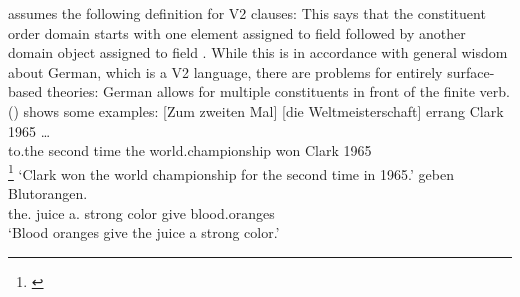 \documentclass[output=paper]{langsci/langscibook}
\begin{document}
\citet[]{Kathol2001a} assumes the following definition for V2 clauses:
\ea
{} \impl
{}
\z
This says that the constituent order domain starts with one element assigned to field 
followed by another domain object assigned to field . While this is in accordance with
general wisdom about German, which is a V2 language, there are problems for entirely surface-based
theories: German allows for multiple constituents in front of the finite verb. () shows some
examples:
\eal
\label{ex-mult-front}
\ex
\gll {}[Zum zweiten Mal] [die Weltmeisterschaft] errang Clark 1965 \ldots\\
	   \spacebr{}to.the second time \spacebr{}the world.championship won Clark 1965 {}\\
\footnote{
        \citep*[]{Benes71}
      }\label{bsp-zum-zweiten-mal-die-Weltmeisterschaft}
\glt `Clark won the world championship for the second time in 1965.'
\ex
\label{ex-dem-saft-eine-kraeftige-farbe}
 geben Blutorangen.\footnotemark\\
     \spacebr{}the.\DAT{} juice \spacebr{}a.\ACC{}   strong   color give blood.oranges\\
\glt `Blood oranges give the juice a strong color.'
\end{document}
